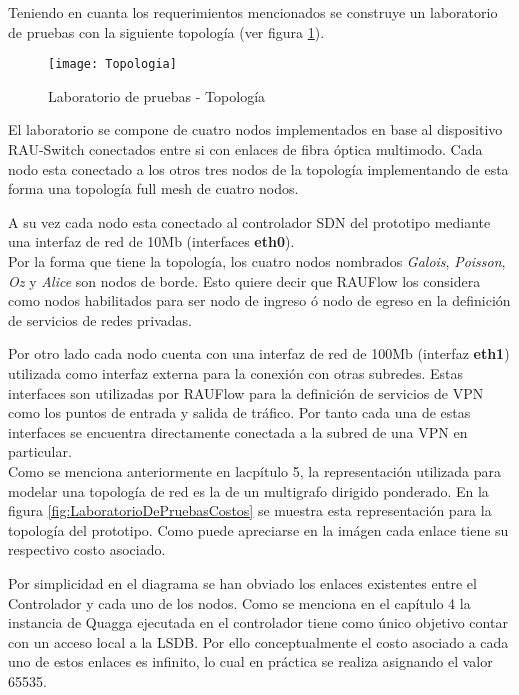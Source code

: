 Teniendo en cuanta los requerimientos mencionados se construye un laboratorio de pruebas con la siguiente topolog\'ia (ver figura \ref{fig:LaboratorioDePruebasTopo}).
  
\begin{figure}[ht!] 
\centering    
\texttt{[image: Topologia]}
\caption[Laboratorio de pruebas - Topolog\'ia]{Laboratorio de pruebas - Topolog\'ia}
\label{fig:LaboratorioDePruebasTopo}
\end{figure}

El laboratorio se compone de cuatro nodos implementados en base al dispositivo RAU-Switch conectados entre si con enlaces de fibra \'optica multimodo. Cada nodo esta conectado a los otros tres nodos de la topolog\'ia implementando de esta forma una topolog\'ia full mesh de cuatro nodos.

A su vez cada nodo esta conectado al controlador SDN del prototipo mediante una interfaz de red de 10Mb (interfaces \textbf{eth0}).\\

Por la forma que tiene la topolog\'ia, los cuatro nodos nombrados \textit{Galois}, \textit{Poisson}, \textit{Oz} y \textit{Alice} son nodos de borde. Esto quiere decir que RAUFlow los considera como nodos habilitados para ser nodo de ingreso \'o nodo de egreso en la definici\'on de servicios de redes privadas.

Por otro lado cada nodo cuenta con una interfaz de red de 100Mb (interfaz \textbf{eth1}) utilizada como interfaz externa para la conexi\'on con otras subredes. Estas interfaces son utilizadas por RAUFlow para la definici\'on de servicios de VPN como los puntos de entrada y salida de tr\'afico. Por tanto cada una de estas interfaces se encuentra directamente conectada a la subred de una VPN en particular.\\  

Como se menciona anteriormente en lacp\'itulo 5, la representaci\'on utilizada para modelar una topolog\'ia de red es la de un multigrafo dirigido ponderado. En la figura \ref{fig:LaboratorioDePruebasCostos} se muestra esta representaci\'on para la topolog\'ia del prototipo. Como puede apreciarse en la im\'agen cada enlace tiene su respectivo costo asociado.

Por simplicidad en el diagrama se han obviado los enlaces existentes entre el Controlador y cada uno de los nodos. Como se menciona en el cap\'itulo 4 la instancia de Quagga ejecutada en el controlador tiene como \'unico objetivo contar con un acceso local a la LSDB. Por ello conceptualmente el costo asociado a cada uno de estos enlaces es infinito, lo cual en pr\'actica se realiza asignando el valor 65535.  


